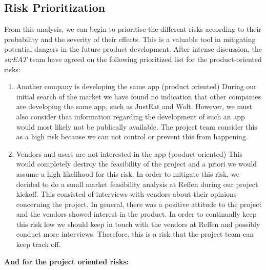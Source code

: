 \subsection{Risk Prioritization}

From this analysis, we can begin to prioritise the different risks according to their probability and the severity of their effects. This is a valuable tool in mitigating potential dangers in the future product development. After intense discussion, the \textit{strEAT} team have agreed on the following prioritized list for the product-oriented risks:

\begin{enumerate}
    \item Another company is developing the same app (product oriented)
   During our initial search of the market we have found no indication that other companies are developing the same app, such as JustEat and Wolt. However, we must also consider that information regarding the development of such an app would most likely not be publically available.
   The project team consider this as a high risk because we can not control or prevent this from happening.
   \item Vendors and users are not interested in the app (product oriented)
   This would completely destroy the feasibility of the project and a priori we would assume a high likelihood for this risk. In order to mitigate this risk, we decided to do a small market feasibility analysis at Reffen during our project kickoff. This consisted of interviews with vendors about their opinions concerning the project. In general, there was a positive attitude to the project and the vendors showed interest in the product.  In order to continually keep this risk low we should keep in touch with the vendors at Reffen and possibly conduct more interviews. Therefore, this is a risk that the project team can keep track off.
\end{enumerate}

\textbf{And for the project oriented risks:}

